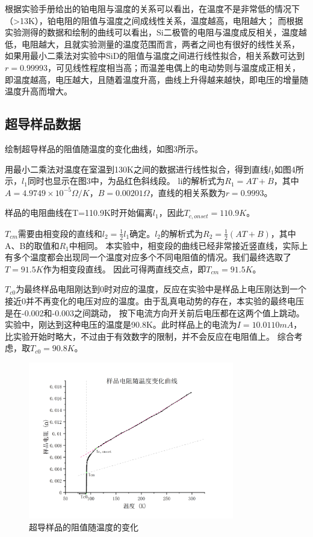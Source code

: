 \documentclass{article}
\begin{document}
    根据实验手册给出的铂电阻与温度的关系可以看出，在温度不是非常低的情况下（>13K），铂电阻的阻值与温度之间成线性关系，温度越高，电阻越大；
    而根据实验测得的数据和绘制的曲线可以看出，Si二极管的电阻与温度成反相关，温度越低，电阻越大，且就实验测量的温度范围而言，两者之间也有很好的线性关系，
    如果用最小二乘法对实验中SiD的阻值与温度之间进行线性拟合，相关系数可达到$r=0.99993$，可见线性程度相当高；而温差电偶上的电动势则与温度成正相关，
    即温度越高，电压越大，且随着温度升高，曲线上升得越来越快，即电压的增量随温度升高而增大。

    \subsection{超导样品数据}
    绘制超导样品的阻值随温度的变化曲线，如图3所示。
    
    用最小二乘法对温度在室温到130K之间的数据进行线性拟合，得到直线$l_1$如图4所示，$l_1$同时也显示在图3中，为品红色斜线段。
    li的解析式为$R_1=A T + B$，其中$A=4.9749\times 10^{-5} \Omega/K$，$B=0.00201\Omega$，直线的相关系数为$r=0.9993$。

    样品的电阻曲线在T=110.9K时开始偏离$l_1$，因此$T_{c,onset}=110.9K$。

    $T_{cm}$需要由相变段的直线和$l_2=\frac{1}{2}l_1$确定。$l_2$的解析式为$R_2=\frac{1}{2}(A T + B)$，其中A、B的取值和$R_1$中相同。
    本实验中，相变段的曲线已经非常接近竖直线，实际上有多个温度都会出现同一个温度对应多个不同电阻值的情况。我们最终选取了$T=91.5K$作为相变段直线。
    因此可得两直线交点，即$T_{cm}=91.5K$。

    $T_{c0}$为最终样品电阻刚达到0时对应的温度，反应在实验中是样品上电压刚达到一个接近0并不再变化的电压对应的温度。由于乱真电动势的存在，本实验的最终电压是在-0.002和-0.003之间跳动，
    按下电流方向开关前后电压都在这两个值上跳动。实验中，刚达到这种电压的温度是90.8K。此时样品上的电流为$I=10.0110mA$，比实验开始时略大，不过由于有效数字的限制，并不会反应在电阻值上。
    综合考虑，取$T_{c0}=90.8K$。

    \begin{figure}[htbp]
        \centering
        \includegraphics[width=0.8\textwidth]{样品电阻.jpg}
        \caption{超导样品的阻值随温度的变化}
    \end{figure}
\end{document}
